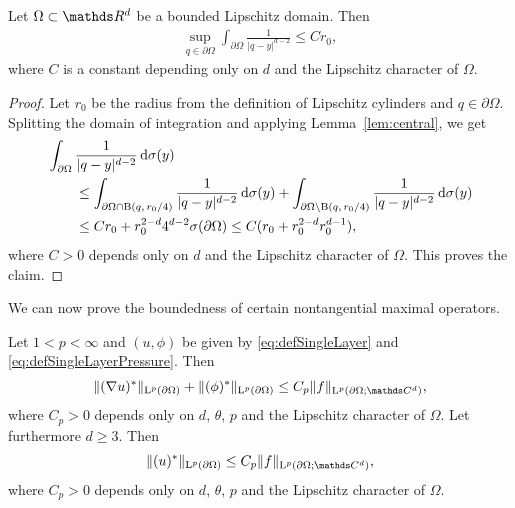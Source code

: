 \begin{lem}
  \label{lem:youngApp}
  Let $\Omega \subset \R^d$ be a bounded Lipschitz domain. Then
  \begin{align*}
    \sup_{q \in \partial\Omega} \int_{\partial\Omega} \frac{1}{|q - y|^{d - 2}} \leq C r_0,
  \end{align*}
  where $C$ is a constant depending only on $d$ and the Lipschitz character of $\Omega$.
\end{lem}

\begin{proof}
  Let $r_0$ be the radius from the definition of Lipschitz cylinders and $q \in \partial\Omega$.
  Splitting the domain of integration and applying Lemma~\ref{lem:central}, we get
  \begin{align*}
    &\int_{\partial\Omega} \frac{1}{|q - y|^{d - 2}} \, {\operatorname{d}\!{\sigma}}(y) \\
    &\qquad \leq \int_{\partial\Omega \cap \mathrm{B}(q,\, r_0/4)} \frac{1}{|q - y|^{d - 2}} \, {\operatorname{d}\!{\sigma}}(y) 
    + \int_{\partial\Omega \setminus \mathrm{B}(q,\, r_0/4)} \frac{1}{|q - y|^{d - 2}} \, {\operatorname{d}\!{\sigma}}(y) \\
    &\qquad\leq C r_0 + r_0^{2 - d} 4^{d - 2} \sigma(\partial\Omega)
    \leq C ( r_0 + r_0^{2 - d} r_0^{d - 1}),
  \end{align*}
  where $C > 0$ depends only on $d$ and the Lipschitz character of $\Omega$.
  This proves the claim.
\end{proof}

We can now prove the boundedness of certain nontangential maximal operators.
\begin{lem}
  \label{lem:nontangentialMaximalFunctions}
  Let $1 < p < \infty$ and $(u,\phi)$ be given by \eqref{eq:defSingleLayer} and \eqref{eq:defSingleLayerPressure}.
  Then 
  \begin{align}
    \| (\nabla u)^* \|_{\Ell^p(\partial\Omega)}  +  \| (\phi)^* \|_{\Ell^p(\partial\Omega)} \leq C_p \|f\|_{\Ell^p(\partial\Omega; \C^d)},
  \end{align}
  where $C_p > 0$ depends only on $d$, $\theta$, $p$ and the Lipschitz character of $\Omega$.
  Let furthermore $d \geq 3$. Then
  \begin{align}
    \label{eq:estimateUstar}
     \|(u)^*\|_{\Ell^p(\partial\Omega)} \leq C_p \|f\|_{\Ell^p(\partial\Omega; \C^d)},
  \end{align}
  where $C_p > 0$ depends only on $d$, $\theta$, $p$ and the Lipschitz character of $\Omega$.
\end{lem}

